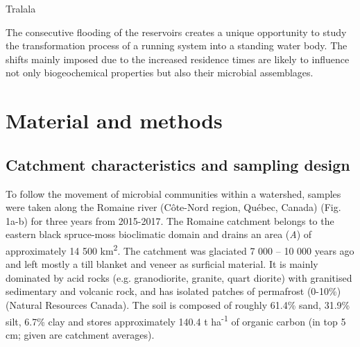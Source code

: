 \documentclass[12pt,a4paper]{article} %
\begin{document}
Tralala

The consecutive flooding of the reservoirs creates a unique opportunity to study the transformation process of a running system into a standing water body. The shifts mainly imposed due to the increased residence times are likely to influence not only biogeochemical properties but also their microbial assemblages.

\section*{Material and methods}
\subsection*{Catchment characteristics and sampling design}
To follow the movement of microbial communities within a watershed, samples were taken along the Romaine river (C\^{o}te-Nord region, Qu\'{e}bec, Canada) (Fig. 1a-b) for three years from 2015-2017. The Romaine catchment belongs to the eastern black spruce-moss bioclimatic domain and drains an area (\textit{A}) of approximately 14 500 km\textsuperscript{2}. The catchment was glaciated 7 000 – 10 000 years ago and left mostly a till blanket and veneer as surficial material. It is mainly dominated by acid rocks (e.g. granodiorite, granite, quart diorite) with granitised sedimentary and volcanic rock, and has isolated patches of permafrost (0-10\%)(Natural Resources Canada). The soil is composed of roughly 61.4\% sand, 31.9\% silt, 6.7\% clay and stores approximately 140.4 t ha\textsuperscript{-1} of organic carbon (in top 5 cm; given are catchment averages)\citep{Lehner2013, Hengl2014}.
\end{document}
